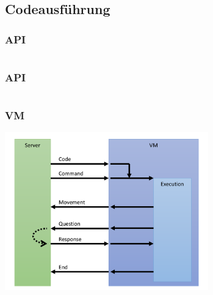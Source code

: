 \subsection{Codeausführung}

\begin{frame}
\frametitle{API}
\inputminted[linenos, numbersep=2pt, tabsize=4, frame=lines, label=move]{ruby}{vm/move.rb}
\end{frame}

\begin{frame}
\frametitle{API}
\inputminted[linenos, numbersep=2pt, tabsize=4, frame=lines, label=look]{ruby}{vm/look.rb}
\end{frame}

\begin{frame}
\frametitle{VM}
\begin{center}
\includegraphics[width=250pt]{vm/vm.pdf}
\end{center}
\end{frame}